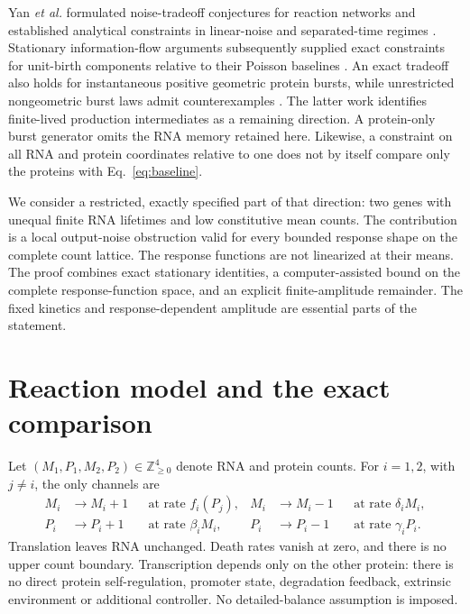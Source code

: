 \documentclass[11pt]{article}
\newcommand{\N}{\mathbb Z_{\geq0}}
\begin{document}
Yan \emph{et al.} formulated noise-tradeoff conjectures for reaction
networks and established analytical constraints in linear-noise and
separated-time regimes \citep{Yan2019}. Stationary information-flow
arguments subsequently supplied exact constraints for unit-birth
components relative to their Poisson baselines
\citep{Ripsman2025,AndersonUnit2026}. An exact tradeoff also holds for
instantaneous positive geometric protein bursts, while unrestricted
nongeometric burst laws admit counterexamples \citep{AndersonBurst2026}.
The latter work identifies finite-lived production intermediates as a
remaining direction. A protein-only burst generator omits the RNA memory
retained here. Likewise, a constraint on all RNA and protein coordinates
relative to one does not by itself compare only the proteins with
Eq.~\eqref{eq:baseline}.

We consider a restricted, exactly specified part of that direction:
two genes with unequal finite RNA lifetimes and low constitutive mean
counts. The contribution is a local output-noise obstruction valid for
every bounded response shape on the complete count lattice. The response
functions are not linearized at their means. The proof combines exact
stationary identities, a computer-assisted bound on the complete
response-function space, and an explicit finite-amplitude remainder.
The fixed kinetics and response-dependent amplitude are essential parts
of the statement.

\section{Reaction model and the exact comparison}
\label{sec:model}

Let $(M_1,P_1,M_2,P_2)\in\N^4$ denote RNA and protein counts. For
$i=1,2$, with $j\ne i$, the only channels are
\begin{align}
 M_i&\longrightarrow M_i+1 &&\text{at rate } f_i(P_j),&
 M_i&\longrightarrow M_i-1 &&\text{at rate } \delta_i M_i,
 \nonumber\\
 P_i&\longrightarrow P_i+1 &&\text{at rate } \beta_i M_i,&
 P_i&\longrightarrow P_i-1 &&\text{at rate } \gamma_i P_i.
 \label{eq:reactions}
\end{align}
Translation leaves RNA unchanged. Death rates vanish at zero, and there
is no upper count boundary. Transcription depends only on the other
protein: there is no direct protein self-regulation, promoter state,
degradation feedback, extrinsic environment or additional controller.
No detailed-balance assumption is imposed.
\end{document}

